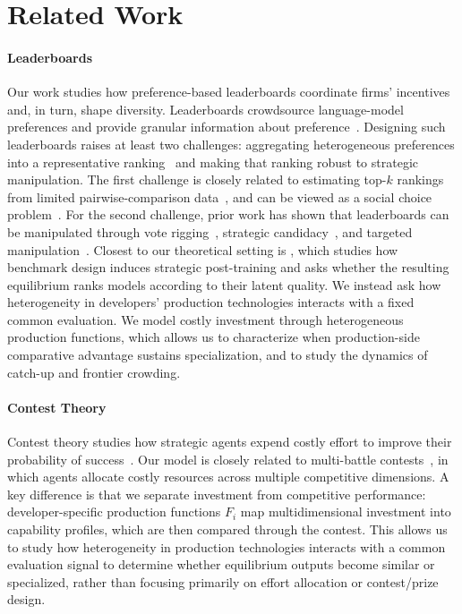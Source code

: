\section{Related Work}
\paragraph{Leaderboards}
Our work studies how preference-based leaderboards coordinate firms’ incentives and, in turn, shape diversity.
Leaderboards crowdsource language-model preferences and provide granular information about preference~\citep{chatbot_arena,copilot_arena}.
Designing such leaderboards raises at least two challenges: aggregating heterogeneous preferences into a representative ranking~\citep{informative_leaderboards} and making that ranking robust to strategic manipulation. 
The first challenge is closely related to estimating top-$k$ rankings from limited pairwise-comparison data~\citep{spectral_mle,condorcet_pairwise}, and can be viewed as a social choice problem~\citep{pluralistic_leaderboards,evaluation_social_choice}.
For the second challenge, prior work has shown that leaderboards can be manipulated through vote rigging~\citep{vote_rigging}, strategic candidacy~\citep{leaderboard_illusion,strategic_candidacy}, and targeted manipulation~\citep{dropping_preferences}.
Closest to our theoretical setting is \citet{leaderboard_incentives}, which studies how benchmark design induces strategic post-training and asks whether the resulting equilibrium ranks models according to their latent quality. 
We instead ask how heterogeneity in developers' production technologies interacts with a fixed common evaluation. 
We model costly investment through heterogeneous production functions, which allows us to characterize when production-side comparative advantage sustains specialization, and to study the dynamics of catch-up and frontier crowding.

\paragraph{Contest Theory}
Contest theory studies how strategic agents expend costly effort to improve their probability of success~\citep{borel_contest_theory,advertising_contest,contest_success_function}. 
Our model is closely related to multi-battle contests~\citep{tullock_contest,multi_battle_contests}, in which agents allocate costly resources across multiple competitive dimensions. 
A key difference is that we separate investment from competitive performance: developer-specific production functions \(F_i\) map multidimensional investment into capability profiles, which are then compared through the contest. 
This allows us to study how heterogeneity in production technologies interacts with a common evaluation signal to determine whether equilibrium outputs become similar or specialized, rather than focusing primarily on effort allocation or contest/prize design.


